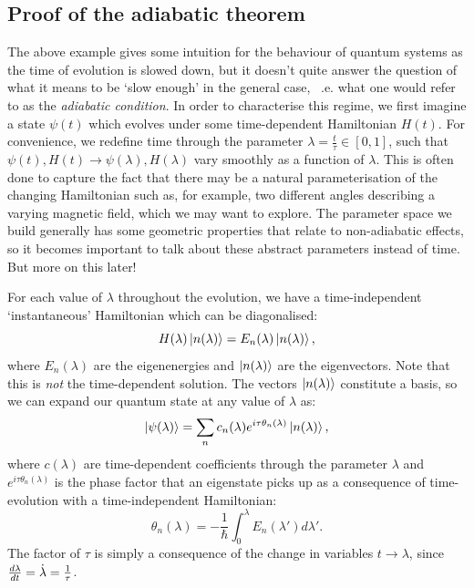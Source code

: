     \subsection{Proof of the adiabatic theorem}\label{sec:2.1.1_proof_adiabatic_theorem}

    The above example gives some intuition for the behaviour of quantum systems as the time of evolution is slowed down, but it doesn't quite answer the question of what it means to be `slow enough' in the general case, ~\@i.e. what one would refer to as the \emph{adiabatic condition}. In order to characterise this regime, we first imagine a state $\psi(t)$ which evolves under some time-dependent Hamiltonian $H(t)$. For convenience, we redefine time through the parameter $\lambda = \frac{t}{\tau} \in [0,1]$, such that $\psi(t), H(t) \rightarrow \psi(\lambda), H(\lambda)$ vary smoothly as a function of $\lambda$. This is often done to capture the fact that there may be a natural parameterisation of the changing Hamiltonian such as, for example, two different angles describing a varying magnetic field, which we may want to explore. The parameter space we build generally has some geometric properties that relate to non-adiabatic effects, so it becomes important to talk about these abstract parameters instead of time. But more on this later!
    
    For each value of $\lambda$ throughout the evolution, we have a time-independent `instantaneous' Hamiltonian which can be diagonalised:
    \begin{equation}\label{eq:instantaneous_schroedinger}
        H(\lambda)\ket{n(\lambda)} = E_n(\lambda)\ket{n(\lambda)},
    \end{equation}
    where $E_n(\lambda)$ are the eigenenergies and $\ket{n(\lambda)}$ are the eigenvectors. Note that this is \emph{not} the time-dependent solution. The vectors $\ket{n(\lambda)}$ constitute a basis, so we can expand our quantum state at any value of $\lambda$ as:
    \begin{equation}\label{eq:adiabatic_basis_expansion}
        \ket{\psi(\lambda)} = \sum_n c_n(\lambda)e^{i \tau \theta_n(\lambda)}\ket{n(\lambda)},
    \end{equation}
    where $c(\lambda)$ are time-dependent coefficients through the parameter $\lambda$ and $e^{i \tau \theta_n(\lambda)}$ is the phase factor that an eigenstate picks up as a consequence of time-evolution with a time-independent Hamiltonian:
    \begin{equation}\label{eq:dynamical_phase}
        \theta_n(\lambda) = -\frac{1}{\hbar} \int_0^{\lambda} E_n(\lambda') d\lambda'.
    \end{equation}
    The factor of $\tau$ is simply a consequence of the change in variables $t \rightarrow \lambda$, since $\frac{d \lambda}{dt} = \dot{\lambda} = \frac{1}{\tau}$.
    
